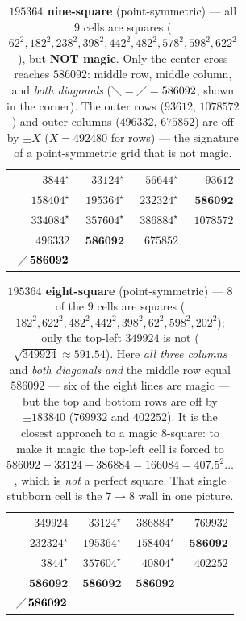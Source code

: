 \documentclass[11pt]{article}
\begin{document}
\begin{table}[h]
\centering
\begin{tabular}{|rrr||r|}
\hline
$3844^\star$ & $33124^\star$ & $56644^\star$ & $93612$\\
$158404^\star$ & $195364^\star$ & $232324^\star$ & $\mathbf{586092}$\\
$334084^\star$ & $357604^\star$ & $386884^\star$ & $1078572$\\
\hline\hline
$496332$ & $\mathbf{586092}$ & $675852$
   & \shortstack{$\diagdown\,\mathbf{586092}$\\[2pt]$\diagup\,\mathbf{586092}$}\\
\hline
\end{tabular}
\caption{\textbf{$195364$ nine-square} (point-symmetric) --- all $9$ cells are
squares ($62^2,182^2,238^2,398^2,442^2,482^2,578^2,598^2,622^2$), but \textbf{NOT
magic}. Only the center cross reaches $586092$: middle row, middle column, and
\emph{both diagonals} ($\diagdown=\diagup=586092$, shown in the corner). The outer
rows ($93612,\,1078572$) and outer columns ($496332,\,675852$) are off by $\pm X$
($X=492480$ for rows) --- the signature of a point-symmetric grid that is not
magic.}
\end{table}

\begin{table}[h]
\centering
\begin{tabular}{|rrr||r|}
\hline
$349924$ & $33124^\star$ & $386884^\star$ & $769932$\\
$232324^\star$ & $195364^\star$ & $158404^\star$ & $\mathbf{586092}$\\
$3844^\star$ & $357604^\star$ & $40804^\star$ & $402252$\\
\hline\hline
$\mathbf{586092}$ & $\mathbf{586092}$ & $\mathbf{586092}$
   & \shortstack{$\diagdown\,\mathbf{586092}$\\[2pt]$\diagup\,\mathbf{586092}$}\\
\hline
\end{tabular}
\caption{\textbf{$195364$ eight-square} (point-symmetric) --- $8$ of the $9$ cells
are squares ($182^2,622^2,482^2,442^2,398^2,62^2,598^2,202^2$); only the top-left
$349924$ is not ($\sqrt{349924}\approx591.54$). Here \emph{all three columns} and
\emph{both diagonals} \emph{and} the middle row equal $586092$ --- six of the eight
lines are magic --- but the top and bottom rows are off by $\pm183840$
($769932$ and $402252$). It is the closest approach to a magic $8$-square: to make
it magic the top-left cell is forced to $586092-33124-386884=166084=407.5^2\ldots$,
which is \emph{not} a perfect square. That single stubborn cell is the $7\!\to\!8$
wall in one picture.}
\end{table}
\end{document}
